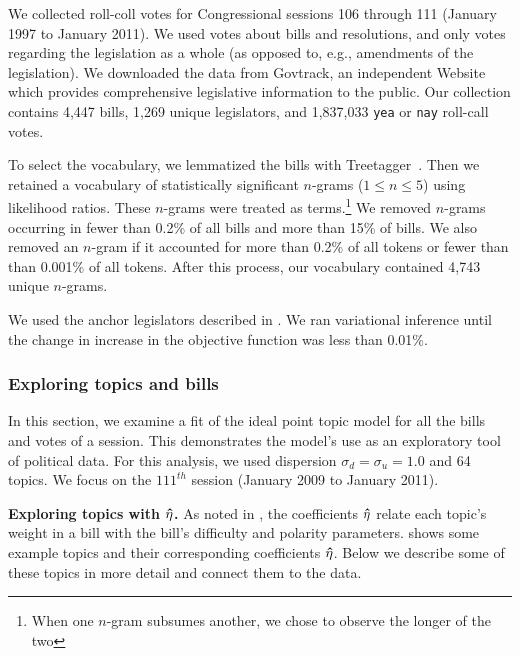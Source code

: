 We collected roll-coll votes for Congressional sessions 106 through
111 (January 1997 to January 2011).  We used votes about bills and
resolutions, and only votes regarding the legislation as a whole
(as opposed to, e.g., amendments of the legislation). We downloaded
the data from Govtrack, an independent Website which provides
comprehensive legislative information to the public.  Our
collection contains 4,447 bills, 1,269 unique legislators, and
1,837,033 \verb!yea! or \verb!nay! roll-call votes.

To select the vocabulary, we lemmatized the bills with
Treetagger~\cite{treetagger}.  Then we retained a vocabulary of
statistically significant $n$-grams ($1 \le n \le 5$) using likelihood
ratios.  These $n$-grams were treated as terms.\footnote{When one
  $n$-gram subsumes another, we chose to observe the longer of the
  two}  We removed $n$-grams occurring in fewer than 0.2\% of all
bills and more than 15\% of bills.  We also removed an
$n$-gram if it accounted for more than 0.2\% of all tokens or fewer
than than 0.001\% of all tokens.  After this process, our vocabulary
contained 4,743 unique $n$-grams.

We used the anchor legislators described in .  We ran
variational inference until the change in increase in the objective
function was less than 0.01\%.

\subsubsection*{Exploring topics and bills}

In this section, we examine a fit of the ideal point topic model for
all the bills and votes of a session.  This demonstrates the model's
use as an exploratory tool of political data.  For this analysis, we
used dispersion $\sigma_d = \sigma_u = 1.0$ and 64 topics.  We focus
on the $111^{th}$ session (January 2009 to January 2011).

\textbf{Exploring topics with $\bm \hat \eta$.} As noted in , the
coefficients $\bm \hat \eta$ relate each topic's weight in a bill with the
bill's difficulty and polarity parameters.  shows
some example topics and their corresponding coefficients $\bm \hat \eta$.  Below
we describe some of these topics in more detail and connect them to
the data.

